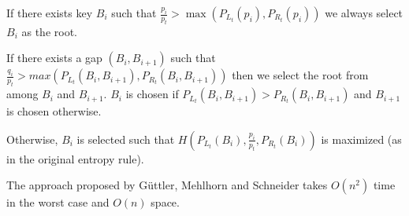 \documentclass[]{beamer}
\theoremstyle{plain}
\begin{document}
\begin{frame}
If there exists key $B_i$ such that $\frac{p_i}{p_t} > \max(P_{L_t}(p_i), P_{R_t}(p_i))$ we always select $B_i$ as the root.

If there exists a gap $(B_i, B_{i+1})$ such that $\frac{q_i}{p_t} > max(P_{L_t}(B_i, B_{i+1}), P_{R_t}(B_i, B_{i+1}))$ then we select the root from among $B_i$ and $B_{i+1}$. $B_i$ is chosen if $P_{L_t}(B_i, B_{i+1}) > P_{R_t}(B_i, B_{i+1})$ and $B_{i+1}$ is chosen otherwise.

Otherwise, $B_i$ is selected such that $H(P_{L_t}(B_i), \frac{p_i}{p_t}, P_{R_t}(B_i))$ is maximized (as in the original entropy rule).



The approach proposed by G{\"u}ttler, Mehlhorn and Schneider takes $O(n^2)$ time in the worst case and $O(n)$ space.
\end{frame}
\end{document}
